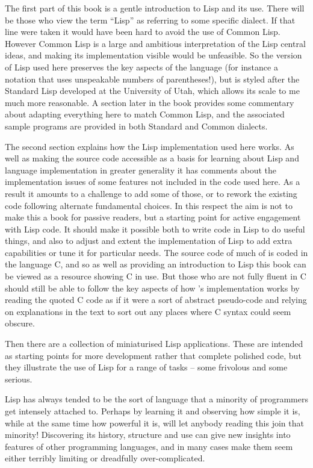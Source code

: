 The first part of this book is a gentle introduction to Lisp and its
use. There will be those who view the term ``Lisp'' as referring to some
specific dialect. If that line were taken it would have been hard to avoid
the use of Common Lisp\cite{Steele:1990:CLL}. However Common Lisp is a large
and ambitious interpretation of the Lisp central ideas, and making its
implementation visible would be unfeasible. So the version of Lisp
used here preserves the key aspects of the language (for instance a notation
that uses unspeakable numbers of parentheses!), but is styled after
the Standard Lisp developed at the University of Utah\cite{StdLisp2},
which allows its scale to me much more reasonable. A section later in the book
provides some commentary about adapting everything here to match Common Lisp,
and the associated sample programs are provided in both Standard and Common
dialects.

The second section explains how the Lisp implementation used here works.
As well as making the source code accessible as a basis for learning about
Lisp and language implementation in greater generality it has comments
about the implementation issues of some features not included in the
code used here. As a result it amounts to a challenge to add some of
those, or to rework the existing code following alternate fundamental choices.
In this respect the aim is not to make this a book for passive readers, but
a starting point for active engagement with Lisp code. It should make it
possible both to write code in Lisp to do useful things, and also to
adjust and extent the implementation of Lisp to add extra capabilities or
tune it for particular needs. The source code of much of \vsl{} is coded
in the language C, and so as well as providing an introduction to Lisp this
book can be viewed as a resource showing C in use. But those who are not
fully fluent in C should still be able to follow the key aspects of how
\vsl's implementation works by reading the quoted C code as if it were
a sort of abstract pseudo-code and relying on explanations in the text to
sort out any places where C syntax could seem obscure.

Then there are a collection of miniaturised Lisp applications. These are
intended as starting points for more development rather that complete
polished code, but they illustrate the use of Lisp for a range of
tasks -- some frivolous and some serious.

Lisp has always tended to be the sort of language that a minority
of programmers get intensely attached to. Perhaps by learning it and
observing how simple it is, while at the same time how powerful it is,
will let anybody reading this join that minority! Discovering its history,
structure and use can give new insights into features of other
programming languages, and in many cases make them seem either
terribly limiting or dreadfully over-complicated. 

